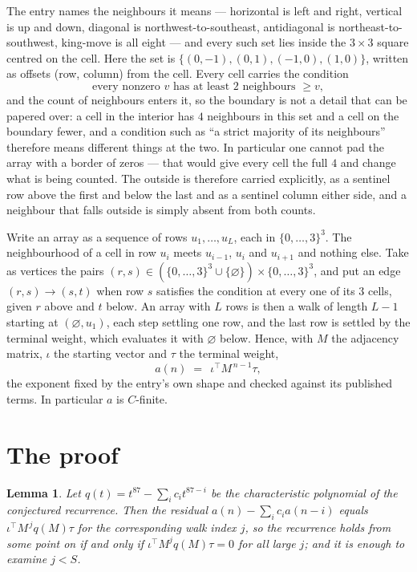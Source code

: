 \documentclass[11pt,a4paper]{article}
\theoremstyle{plain}
\newtheorem{lemma}[theorem]{Lemma}
\theoremstyle{definition}
\begin{document}
The entry names the neighbours it means --- horizontal is left and right, vertical is up and
down, diagonal is northwest-to-southeast, antidiagonal is northeast-to-southwest, king-move is
all eight --- and every such set lies inside the $3\times3$ square centred on the cell. Here
the set is $\{(0,-1), (0,1), (-1,0), (1,0)\}$, written as offsets (row, column) from the cell. Every cell carries
the condition
\[
\text{every nonzero }v\text{ has at least 2 neighbours }\ge v,
\]
and the count of neighbours enters it, so the boundary is not a detail that can be papered
over: a cell in the interior has $4$ neighbours in this set and a cell on the boundary
fewer, and a condition such as ``a strict majority of its neighbours'' therefore means
different things at the two. In particular one cannot pad the array with a border of zeros ---
that would give every cell the full $4$ and change what is being counted. The outside is
therefore carried
explicitly, as a sentinel row above the first and below the last and as a sentinel column
either side, and a neighbour that falls outside is simply absent from both counts.

Write an array as a sequence of rows $u_1,\dots,u_L$, each in
$\{0,\dots,3\}^{3}$. The neighbourhood of a cell in row $u_i$ meets $u_{i-1}$,
$u_i$ and $u_{i+1}$ and nothing else. Take as vertices the pairs
$(r,s)\in(\{0,\dots,3\}^{3}\cup\{\varnothing\})\times\{0,\dots,3\}^{3}$,
and put an edge $(r,s)\to(s,t)$ when row $s$ satisfies the condition at every one of its
$3$ cells, given $r$ above and $t$ below. An array with $L$ rows is then a walk of length
$L-1$ starting at $(\varnothing,u_1)$, each step settling one row, and the last row is
settled by the terminal weight, which evaluates it with $\varnothing$ below. Hence,
with $M$ the adjacency matrix, $\iota$ the starting vector and $\tau$ the terminal weight,
\[
a(n)\;=\;\,\iota^{\!\top}M^{\,n-1}\tau ,
\]
the exponent fixed by the entry's own shape and checked against its published terms. In
particular $a$ is $C$-finite.

\section{The proof}

\begin{lemma}\label{lem:crit}
Let $q(t)=t^{87}-\sum_i c_it^{87-i}$ be the characteristic polynomial of the
conjectured recurrence. Then the residual $a(n)-\sum_ic_ia(n-i)$ equals
$\iota^{\!\top}M^{\,j}q(M)\tau$ for the corresponding walk index $j$, so the
recurrence holds from some point on if and only if $\iota^{\!\top}M^{j}q(M)\tau=0$ for all
large $j$; and it is enough to examine $j<S$.
\end{lemma}
\end{document}

